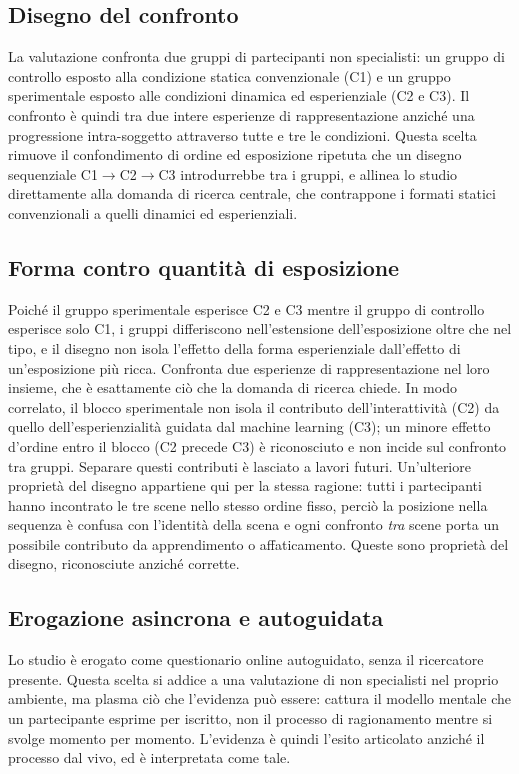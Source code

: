 \subsection*{Disegno del confronto}
La valutazione confronta due gruppi di partecipanti non specialisti: un gruppo di controllo esposto alla condizione statica convenzionale (C1) e un gruppo sperimentale esposto alle condizioni dinamica ed esperienziale (C2 e C3). Il confronto è quindi tra due intere esperienze di rappresentazione anziché una progressione intra-soggetto attraverso tutte e tre le condizioni. Questa scelta rimuove il confondimento di ordine ed esposizione ripetuta che un disegno sequenziale C1$\rightarrow$C2$\rightarrow$C3 introdurrebbe tra i gruppi, e allinea lo studio direttamente alla domanda di ricerca centrale, che contrappone i formati statici convenzionali a quelli dinamici ed esperienziali.

\subsection*{Forma contro quantità di esposizione}
Poiché il gruppo sperimentale esperisce C2 e C3 mentre il gruppo di controllo esperisce solo C1, i gruppi differiscono nell'estensione dell'esposizione oltre che nel tipo, e il disegno non isola l'effetto della forma esperienziale dall'effetto di un'esposizione più ricca. Confronta due esperienze di rappresentazione nel loro insieme, che è esattamente ciò che la domanda di ricerca chiede. In modo correlato, il blocco sperimentale non isola il contributo dell'interattività (C2) da quello dell'esperienzialità guidata dal machine learning (C3); un minore effetto d'ordine entro il blocco (C2 precede C3) è riconosciuto e non incide sul confronto tra gruppi. Separare questi contributi è lasciato a lavori futuri. Un'ulteriore proprietà del disegno appartiene qui per la stessa ragione: tutti i partecipanti hanno incontrato le tre scene nello stesso ordine fisso, perciò la posizione nella sequenza è confusa con l'identità della scena e ogni confronto \emph{tra} scene porta un possibile contributo da apprendimento o affaticamento. Queste sono proprietà del disegno, riconosciute anziché corrette.

\subsection*{Erogazione asincrona e autoguidata}
Lo studio è erogato come questionario online autoguidato, senza il ricercatore presente. Questa scelta si addice a una valutazione di non specialisti nel proprio ambiente, ma plasma ciò che l'evidenza può essere: cattura il modello mentale che un partecipante esprime per iscritto, non il processo di ragionamento mentre si svolge momento per momento. L'evidenza è quindi l'esito articolato anziché il processo dal vivo, ed è interpretata come tale.

